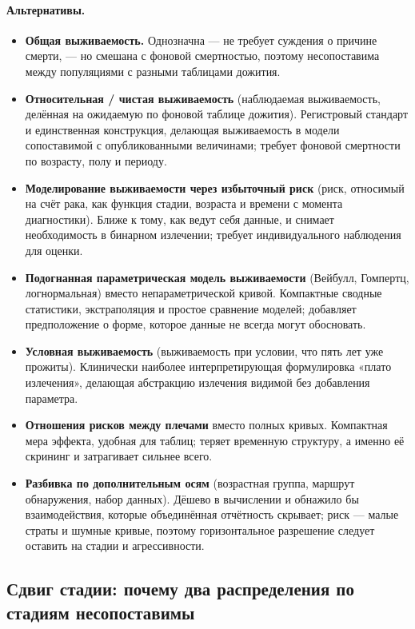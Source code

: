 \documentclass[12pt,a4paper]{article}
\newcommand{\alt}[1]{\paragraph{Альтернативы.} #1}
\begin{document}
\alt{\begin{itemize}[nosep]
  \item \textbf{Общая выживаемость.} Однозначна --- не требует суждения о причине смерти, --- но смешана с
        фоновой смертностью, поэтому несопоставима между популяциями с разными таблицами дожития.
  \item \textbf{Относительная / чистая выживаемость} (наблюдаемая выживаемость, делённая на ожидаемую по
        фоновой таблице дожития). Регистровый стандарт и единственная конструкция, делающая выживаемость в
        модели сопоставимой с опубликованными величинами; требует фоновой смертности по возрасту, полу и
        периоду.
  \item \textbf{Моделирование выживаемости через избыточный риск} (риск, относимый на счёт рака, как функция
        стадии, возраста и времени с момента диагностики). Ближе к тому, как ведут себя данные, и снимает
        необходимость в бинарном излечении; требует индивидуального наблюдения для оценки.
  \item \textbf{Подогнанная параметрическая модель выживаемости} (Вейбулл, Гомпертц, логнормальная) вместо
        непараметрической кривой. Компактные сводные статистики, экстраполяция и простое сравнение моделей;
        добавляет предположение о форме, которое данные не всегда могут обосновать.
  \item \textbf{Условная выживаемость} (выживаемость при условии, что пять лет уже прожиты). Клинически
        наиболее интерпретирующая формулировка «плато излечения», делающая абстракцию излечения видимой без
        добавления параметра.
  \item \textbf{Отношения рисков между плечами} вместо полных кривых. Компактная мера эффекта, удобная для
        таблиц; теряет временную структуру, а именно её скрининг и затрагивает сильнее всего.
  \item \textbf{Разбивка по дополнительным осям} (возрастная группа, маршрут обнаружения, набор данных).
        Дёшево в вычислении и обнажило бы взаимодействия, которые объединённая отчётность скрывает; риск ---
        малые страты и шумные кривые, поэтому горизонтальное разрешение следует оставить на стадии и
        агрессивности.
\end{itemize}}

\subsection{Сдвиг стадии: почему два распределения по стадиям несопоставимы}
\label{sec:stageshift}
\end{document}
